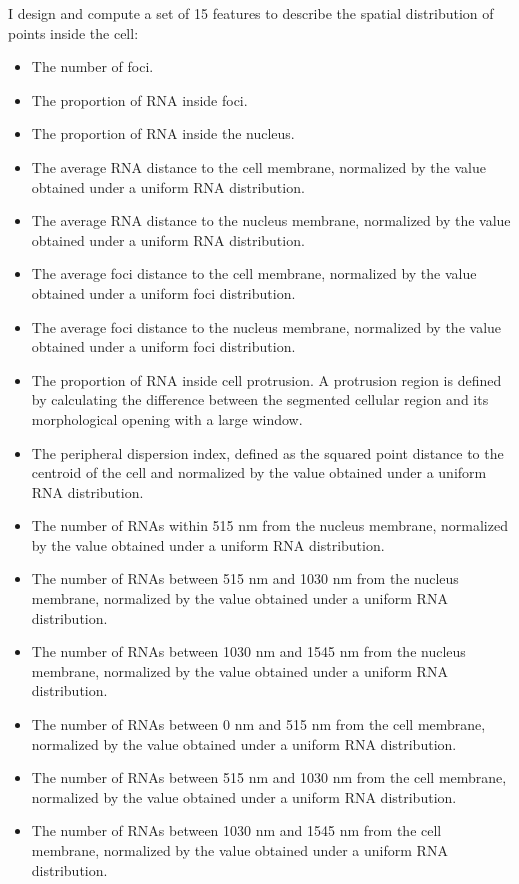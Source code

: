 I design and compute a set of 15 features to describe the spatial distribution of points inside the cell:
\begin{itemize}
	\setlength\itemsep{0.1em}
	\item The number of foci.
	\item The proportion of \ac{RNA} inside foci.
	\item The proportion of \ac{RNA} inside the nucleus.
	\item The average \ac{RNA} distance to the cell membrane, normalized by the value obtained under a uniform \ac{RNA} distribution.
	\item The average \ac{RNA} distance to the nucleus membrane, normalized by the value obtained under a uniform \ac{RNA} distribution.
	\item The average foci distance to the cell membrane, normalized by the value obtained under a uniform foci distribution.
	\item The average foci distance to the nucleus membrane, normalized by the value obtained under a uniform foci distribution.
	\item The proportion of \ac{RNA} inside cell protrusion.
	A protrusion region is defined by calculating the difference between the segmented cellular region and its morphological opening with a large window.
	\item The peripheral dispersion index, defined as the squared point distance to the centroid of the cell and normalized by the value obtained under a uniform \ac{RNA} distribution.
	\item The number of \ac{RNA}s within 515 nm from the nucleus membrane, normalized by the value obtained under a uniform \ac{RNA} distribution.
	\item The number of \ac{RNA}s between 515 nm and 1030 nm from the nucleus membrane, normalized by the value obtained under a uniform \ac{RNA} distribution.
	\item The number of \ac{RNA}s between 1030 nm and 1545 nm from the nucleus membrane, normalized by the value obtained under a uniform \ac{RNA} distribution.
	\item The number of \ac{RNA}s between 0 nm and 515 nm from the cell membrane, normalized by the value obtained under a uniform \ac{RNA} distribution.
	\item The number of \ac{RNA}s between 515 nm and 1030 nm from the cell membrane, normalized by the value obtained under a uniform \ac{RNA} distribution.
	\item The number of \ac{RNA}s between 1030 nm and 1545 nm from the cell membrane, normalized by the value obtained under a uniform \ac{RNA} distribution.
\end{itemize}

